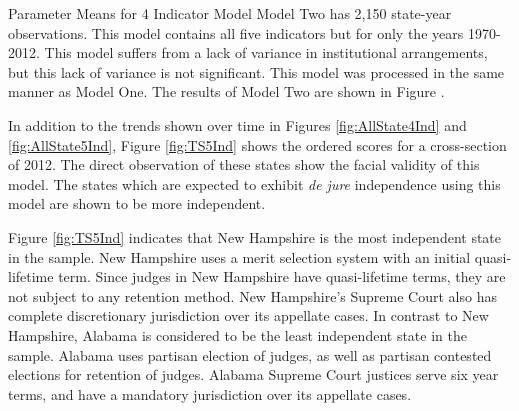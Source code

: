 \documentclass[12pt]{article}
\begin{document}

  Parameter Means for 4 Indicator Model
Model Two has 2,150 state-year observations. This model contains all five indicators but for only the years 1970-2012.  This model suffers from a lack of variance in institutional arrangements, but this lack of variance is not significant.  This model was processed in the same manner as Model One.  The results of Model Two are shown in Figure .


In addition to the trends shown over time in Figures \ref{fig:AllState4Ind} and \ref{fig:AllState5Ind}, Figure \ref{fig:TS5Ind} shows the ordered scores for a cross-section of 2012. The direct observation of these states show the facial validity of this model.  The states which are expected to exhibit \textit{de jure} independence using this model are shown to be more independent.  


Figure \ref{fig:TS5Ind} indicates that New Hampshire is the most independent state in the sample.  New Hampshire uses a merit selection system with an initial quasi-lifetime term.  Since judges in New Hampshire have quasi-lifetime terms, they are not subject to any retention method.  New Hampshire's Supreme Court also has complete discretionary jurisdiction over its appellate cases.  In contrast to New Hampshire, Alabama is considered to be the least independent state in the sample.  Alabama uses partisan election of judges, as well as partisan contested elections for retention of judges.  Alabama Supreme Court justices serve six year terms, and have a mandatory jurisdiction over its appellate cases.
\end{document}
